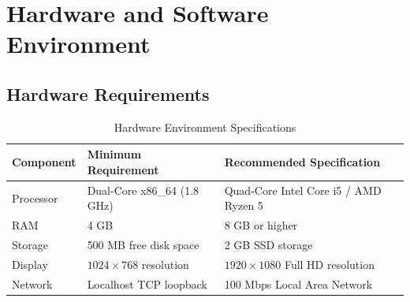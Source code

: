 \section{Hardware and Software Environment}

\subsection{Hardware Requirements}
\begin{table}[h!]
    \centering
    \caption{Hardware Environment Specifications}
    \begin{tabular}{lll}
        \toprule
        \textbf{Component} & \textbf{Minimum Requirement} & \textbf{Recommended Specification} \\
        \midrule
        Processor & Dual-Core x86\_64 (1.8 GHz) & Quad-Core Intel Core i5 / AMD Ryzen 5 \\
        RAM & 4 GB & 8 GB or higher \\
        Storage & 500 MB free disk space & 2 GB SSD storage \\
        Display & $1024 \times 768$ resolution & $1920 \times 1080$ Full HD resolution \\
        Network & Localhost TCP loopback & 100 Mbps Local Area Network \\
        \bottomrule
    \end{tabular}
    \label{tab:hardware_specs}
\end{table}

